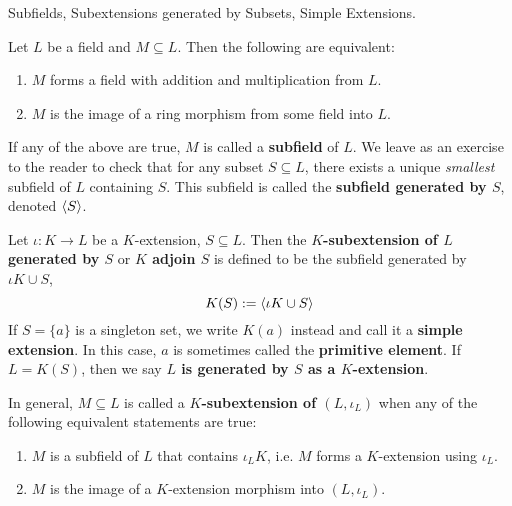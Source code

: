 \documentclass[../book.tex]{subfiles}
\begin{document}
\begin{dfn} Subfields, Subextensions generated by Subsets, Simple Extensions. 

    Let $L$ be a field and $M \subseteq L$.
    Then the following are equivalent: 
    \begin{enumerate}
        \item $M$ forms a field with addition and multiplication from $L$.
        \item $M$ is the image of a ring morphism from some field into $L$. 
    \end{enumerate}
    If any of the above are true, $M$ is called a \textbf{subfield} of $L$. 
    We leave as an exercise to the reader to check that for any subset $S \subseteq L$,
    there exists a unique \emph{smallest} subfield of $L$ containing $S$.
    This subfield is called the \textbf{subfield generated by $S$}, denoted $\langle S\rangle$. 

    Let $\iota : K \to L$ be a $K$-extension, $S \subseteq L$. 
    Then the \textbf{$K$-subextension of $L$ generated by $S$} or 
    \textbf{$K$ adjoin $S$} is defined to be the subfield generated by $\iota K \cup S$, 
    \[ K(S) := \langle \iota K \cup S\rangle \]
    If $S = \{a\}$ is a singleton set, we write $K(a)$ instead
    and call it a \textbf{simple extension}. 
    In this case, $a$ is sometimes called the \textbf{primitive element}. 
    If $L = K(S)$, then we say \textbf{$L$ is generated by $S$ as a $K$-extension}.
    
    In general, $M \subseteq L$ is called a \textbf{$K$-subextension of $(L,\iota_L)$}
    when any of the following equivalent statements are true:
    \begin{enumerate}
        \item $M$ is a subfield of $L$ that contains $\iota_L K$, i.e.
        $M$ forms a $K$-extension using $\iota_L$.  
        \item $M$ is the image of a $K$-extension morphism into $(L,\iota_L)$. 
    \end{enumerate}

\end{dfn}
\end{document}
